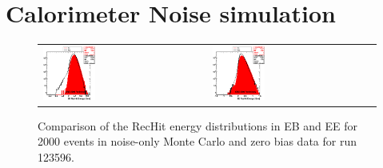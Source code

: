 \section{Calorimeter Noise simulation}
\label{sc:CaloNoise}

\begin{figure}[h!]
 \centering
 \begin{tabular}{ll}
  \includegraphics[width=0.33\textwidth]{plots_CaloNoise/h_RecHitEinEB.eps} &
  \includegraphics[width=0.33\textwidth]{plots_CaloNoise/h_RecHitEinEE.eps} \\
 \end{tabular}
 \caption{\small Comparison of the RecHit energy distributions in EB and EE for 2000 events in noise-only Monte Carlo
          and zero bias data for run 123596.\label{fig:RecHitE}}
\end{figure}

